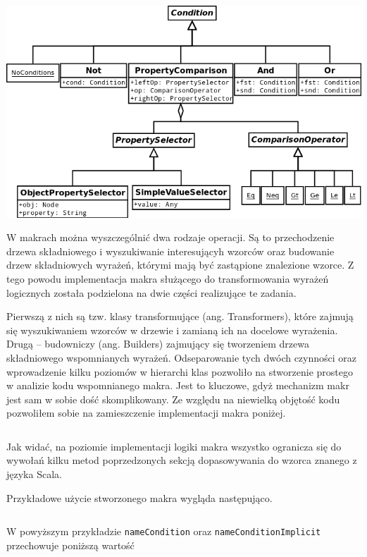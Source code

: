 \documentclass[brudnopis]{xmgr}
\begin{document}
\includegraphics[scale=0.5]{images/conditions-uml.png}

W makrach można wyszczególnić dwa rodzaje operacji. Są to przechodzenie drzewa składniowego i wyszukiwanie interesującyh wzorców oraz budowanie drzew składniowych wyrażeń, którymi mają być zastąpione znalezione wzorce. Z tego powodu implementacja makra służącego do transformowania wyrażeń logicznych została podzielona na dwie części realizujące te zadania.

Pierwszą z nich są tzw. klasy transformujące (ang. Transformers), które zajmują się wyszukiwaniem wzorców w drzewie i zamianą ich na docelowe wyrażenia. Drugą -- budowniczy (ang. Builders) zajmujący się tworzeniem drzewa składniowego wspomnianych wyrażeń. Odseparowanie tych dwóch czynności oraz wprowadzenie kilku poziomów w hierarchi klas pozwoliło na stworzenie prostego w analizie kodu wspomnianego makra. Jest to kluczowe, gdyż mechanizm makr jest sam w sobie dość skomplikowany.  Ze względu na niewielką objętość kodu pozwoliłem sobie na zamieszczenie implementacji makra poniżej.

\inputminted{scala}{listings/scala/boolean-macro-implementation.scala}

Jak widać, na poziomie implementacji logiki makra wszystko ogranicza się do wywołań kilku metod poprzedzonych sekcją dopasowywania do wzorca znanego z języka Scala.

\medskip\noindent Przykładowe użycie stworzonego makra wygląda następująco.

\inputminted{scala}{listings/scala/macro-usage.scala}

W powyższym przykładzie \texttt{nameCondition} oraz  \texttt{nameConditionImplicit} przechowuje poniższą wartość

\inputminted{scala}{listings/scala/macro-usage-result.scala}
\end{document}
